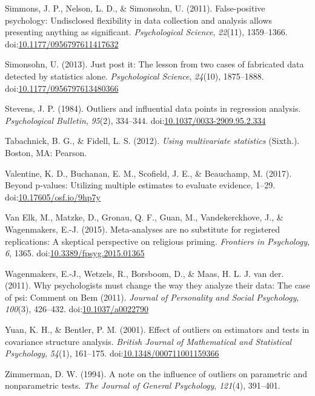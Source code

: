 \documentclass[english,,man]{apa6}
\begin{document}
\leavevmode\hypertarget{ref-Simmons2011}{}%
Simmons, J. P., Nelson, L. D., \& Simonsohn, U. (2011). False-positive psychology: Undisclosed flexibility in data collection and analysis allows presenting anything as significant. \emph{Psychological Science}, \emph{22}(11), 1359--1366. doi:\href{https://doi.org/10.1177/0956797611417632}{10.1177/0956797611417632}

\leavevmode\hypertarget{ref-Simonsohn2013}{}%
Simonsohn, U. (2013). Just post it: The lesson from two cases of fabricated data detected by statistics alone. \emph{Psychological Science}, \emph{24}(10), 1875--1888. doi:\href{https://doi.org/10.1177/0956797613480366}{10.1177/0956797613480366}

\leavevmode\hypertarget{ref-Stevens1984}{}%
Stevens, J. P. (1984). Outliers and influential data points in regression analysis. \emph{Psychological Bulletin}, \emph{95}(2), 334--344. doi:\href{https://doi.org/10.1037/0033-2909.95.2.334}{10.1037/0033-2909.95.2.334}

\leavevmode\hypertarget{ref-Tabachnick2012}{}%
Tabachnick, B. G., \& Fidell, L. S. (2012). \emph{Using multivariate statistics} (Sixth.). Boston, MA: Pearson.

\leavevmode\hypertarget{ref-Valentine2017}{}%
Valentine, K. D., Buchanan, E. M., Scofield, J. E., \& Beauchamp, M. (2017). Beyond p-values: Utilizing multiple estimates to evaluate evidence, 1--29. doi:\href{https://doi.org/10.17605/osf.io/9hp7y}{10.17605/osf.io/9hp7y}

\leavevmode\hypertarget{ref-VanElk2015}{}%
Van Elk, M., Matzke, D., Gronau, Q. F., Guan, M., Vandekerckhove, J., \& Wagenmakers, E.-J. (2015). Meta-analyses are no substitute for registered replications: A skeptical perspective on religious priming. \emph{Frontiers in Psychology}, \emph{6}, 1365. doi:\href{https://doi.org/10.3389/fpsyg.2015.01365}{10.3389/fpsyg.2015.01365}

\leavevmode\hypertarget{ref-Wagenmakers2011a}{}%
Wagenmakers, E.-J., Wetzels, R., Borsboom, D., \& Maas, H. L. J. van der. (2011). Why psychologists must change the way they analyze their data: The case of psi: Comment on Bem (2011). \emph{Journal of Personality and Social Psychology}, \emph{100}(3), 426--432. doi:\href{https://doi.org/10.1037/a0022790}{10.1037/a0022790}

\leavevmode\hypertarget{ref-Yuan2001}{}%
Yuan, K. H., \& Bentler, P. M. (2001). Effect of outliers on estimators and tests in covariance structure analysis. \emph{British Journal of Mathematical and Statistical Psychology}, \emph{54}(1), 161--175. doi:\href{https://doi.org/10.1348/000711001159366}{10.1348/000711001159366}

\leavevmode\hypertarget{ref-Zimmerman1994}{}%
Zimmerman, D. W. (1994). A note on the influence of outliers on parametric and nonparametric tests. \emph{The Journal of General Psychology}, \emph{121}(4), 391--401.
\end{document}
